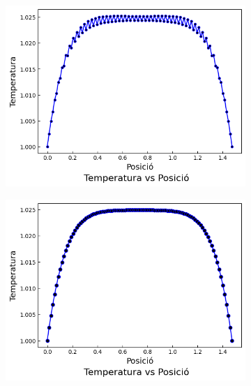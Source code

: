 \documentclass{article}
\begin{document}
\begin{figure}[h]
    \centering
    \begin{subfigure}[b]{0.32\textwidth}
        \includegraphics[width=\textwidth]{images/T_vs_z_at1.png} 
        \caption{}
        \label{fig:err_euler_exp_at1}
    \end{subfigure}
    \hfill
    \begin{subfigure}[b]{0.32\textwidth}
        \includegraphics[width=\textwidth]{images/T_vs_z_at2.png}
        \caption{} 
        \label{fig:err_euler_exp_at2}
    \end{subfigure}
    \hfill
    \begin{subfigure}[b]{0.32\textwidth}

\end{subfigure}
\end{figure}
\end{document}
